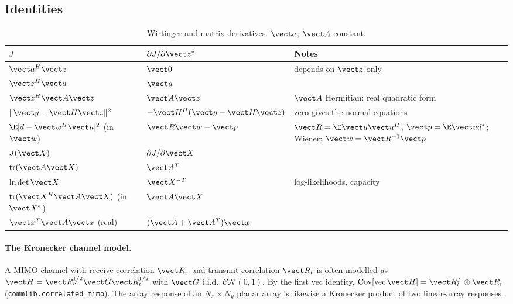 \subsection{Identities}

\begin{table}[htbp]\centering\small
\caption{Wirtinger and matrix derivatives. $\vect a$, $\vect A$ constant.}\label{tab:appA:wirtinger}
\renewcommand{\arraystretch}{1.35}
\begin{tabular}{@{}lll@{}}
\toprule
$J$ & $\partial J/\partial\vect z^*$ & Notes\\
\midrule
$\vect a^H\vect z$ & $\vect 0$ & depends on $\vect z$ only\\
$\vect z^H\vect a$ & $\vect a$ & \\
$\vect z^H\vect A\vect z$ & $\vect A\vect z$ & $\vect A$ Hermitian: real quadratic form\\
$\|\vect y-\vect H\vect z\|^2$ & $-\vect H^H(\vect y-\vect H\vect z)$ & zero gives the normal equations\\
$\E|d-\vect w^H\vect u|^2$ (in $\vect w$) & $\vect R\vect w-\vect p$ & $\vect R=\E\vect u\vect u^H$, $\vect p=\E\vect u d^*$; Wiener: $\vect w=\vect R^{-1}\vect p$\\
\midrule
$J(\vect X)$ & $\partial J/\partial\vect X$ & \\
\midrule
$\operatorname{tr}(\vect A\vect X)$ & $\vect A^T$ & \\
$\ln\det\vect X$ & $\vect X^{-T}$ & log-likelihoods, capacity\\
$\operatorname{tr}(\vect X^H\vect A\vect X)$ (in $\vect X^*$) & $\vect A\vect X$ & \\
$\vect x^T\vect A\vect x$ (real) & $(\vect A+\vect A^T)\vect x$ & \\
\bottomrule
\end{tabular}
\end{table}

\paragraph{The Kronecker channel model.} A MIMO channel with receive correlation $\vect R_r$ and
transmit correlation $\vect R_t$ is often modelled as
$\vect H=\vect R_r^{1/2}\vect G\vect R_t^{1/2}$ with $\vect G$ i.i.d.\ $\mathcal{CN}(0,1)$. By the first
vec identity, $\operatorname{Cov}[\operatorname{vec}\vect H]=\vect R_t^T\otimes\vect R_r$
(\texttt{commlib.correlated\_mimo}). The array response of an $N_x\times N_y$ planar array is
likewise a Kronecker product of two linear-array responses.

